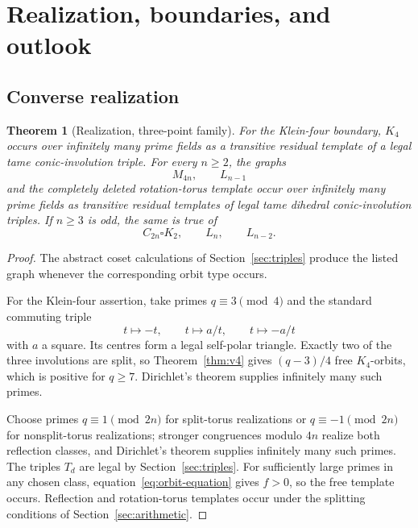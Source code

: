 \documentclass[11pt]{article}
\newtheorem{theorem}{Theorem}[section]
\theoremstyle{definition}
\theoremstyle{remark}
\newcommand{\Cyc}{C}
\newcommand{\Mob}{M}
\begin{document}
\section{Realization, boundaries, and outlook}
\label{sec:boundaries}

\subsection{Converse realization}

\begin{theorem}[Realization, three-point family]
\label{thm:realization-triple}
For the Klein-four boundary, $K_4$ occurs over infinitely many prime fields as a transitive residual
template of a legal tame conic-involution triple. For every $n\ge2$, the graphs
\begin{equation}
  \Mob_{4n},\qquad L_{n-1}
  \label{eq:realized-odd}
\end{equation}
and the completely deleted rotation-torus template occur over infinitely many prime fields as
transitive residual templates of legal tame dihedral conic-involution triples. If $n\ge3$ is odd,
the same is true of
\begin{equation}
  \Cyc_{2n}\square K_2,\qquad L_n,\qquad L_{n-2}.
  \label{eq:realized-even}
\end{equation}
\end{theorem}

\begin{proof}
The abstract coset calculations of Section~\ref{sec:triples} produce the listed graph whenever the
corresponding orbit type occurs.

For the Klein-four assertion, take primes $q\equiv3\pmod4$ and the standard commuting triple
\[
  t\mapsto-t,\qquad t\mapsto a/t,\qquad t\mapsto-a/t
\]
with $a$ a square. Its centres form a legal self-polar triangle. Exactly two of the three
involutions are split, so Theorem~\ref{thm:v4} gives $(q-3)/4$ free $K_4$-orbits, which is positive
for $q\ge7$. Dirichlet's theorem supplies infinitely many such primes.

Choose primes $q\equiv1\pmod{2n}$ for split-torus realizations or $q\equiv-1\pmod{2n}$ for
nonsplit-torus realizations; stronger congruences modulo $4n$ realize both reflection classes, and
Dirichlet's theorem supplies infinitely many such primes. The triples $T_d$ are legal by
Section~\ref{sec:triples}. For sufficiently large primes in any chosen class,
equation~\eqref{eq:orbit-equation} gives $f>0$, so the free template occurs. Reflection and
rotation-torus templates occur under the splitting conditions of Section~\ref{sec:arithmetic}.
\end{proof}
\end{document}
